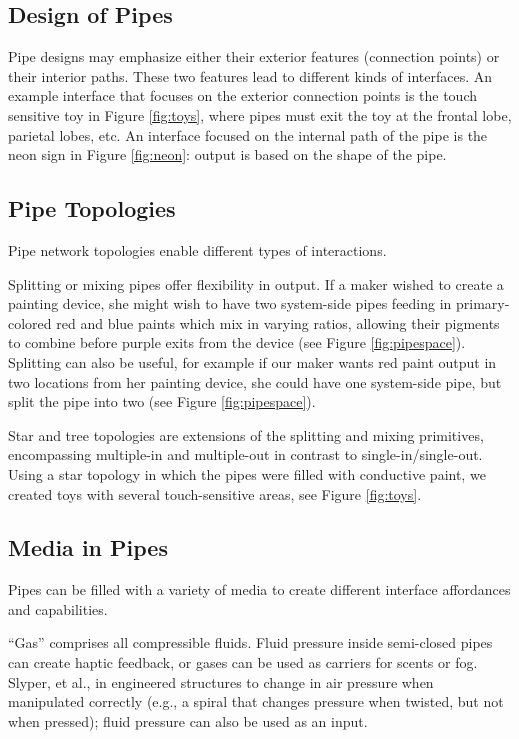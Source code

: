 \subsection{Design of Pipes}
Pipe designs may emphasize either their exterior features (connection points) or their interior paths.  These two features lead to different kinds of interfaces.  An example interface that focuses on the exterior connection points is the touch sensitive toy in Figure \ref{fig:toys}, where pipes must exit the toy at the frontal lobe, parietal lobes, etc.  An interface focused on the internal path of the pipe is the neon sign in Figure \ref{fig:neon}: output is based on the shape of the pipe.

\subsection{Pipe Topologies}

Pipe network topologies enable different types of interactions.

Splitting or mixing pipes offer flexibility in output.  If a maker wished to create a painting device, she might wish to have two system-side pipes feeding in primary-colored red and blue paints which mix in varying ratios, allowing their pigments to combine before purple exits from the device (see Figure \ref{fig:pipespace}).  Splitting can also be useful, for example if our maker wants red paint output in two locations from her painting device, she could have one system-side pipe, but split the pipe into two (see Figure \ref{fig:pipespace}).  

Star and tree topologies are extensions of the splitting and mixing primitives, encompassing multiple-in and multiple-out in contrast to single-in/single-out.  Using a star topology in which the pipes were filled with conductive paint, we created toys with several touch-sensitive areas, see Figure \ref{fig:toys}. 

\subsection{Media in Pipes}

Pipes can be filled with a variety of media to create different interface affordances and capabilities.

``Gas'' comprises all compressible fluids.  Fluid pressure inside semi-closed pipes can create haptic feedback, or gases can be used as carriers for scents or fog.  Slyper, et al.,  in \cite{Slyper-pressure} engineered structures to change in air pressure when manipulated correctly (e.g., a spiral that changes pressure when twisted, but not when pressed); fluid pressure can also be used as an input.


